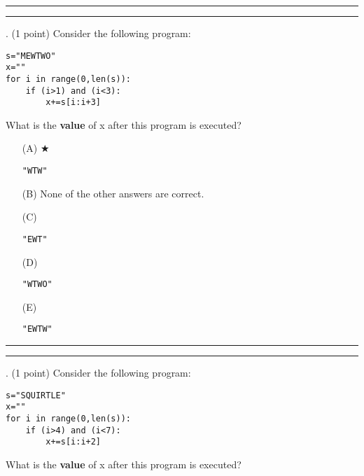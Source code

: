 \documentclass{article}
\begin{document}
\vspace*{2em}
\hrule
\vspace{2em}

\vspace{2em}
\hrule height 2pt


\newpage
{}. (1 point)
Consider the following program:
\begin{verbatim}
s="MEWTWO"
x=""
for i in range(0,len(s)):
    if (i>1) and (i<3):
        x+=s[i:i+3]

\end{verbatim}
What is the \textbf{value} of x after this program is executed?


\begin{enumerate}
\item[(A)] $\bigstar$ 
\begin{verbatim}"WTW"\end{verbatim}

\item[(B)]
None of the other answers are correct.

\item[(C)]
\begin{verbatim}"EWT"\end{verbatim}

\item[(D)]
\begin{verbatim}"WTWO"\end{verbatim}

\item[(E)]
\begin{verbatim}"EWTW"\end{verbatim}

\end{enumerate}

\vspace*{2em}
\hrule
\vspace{2em}

\vspace{2em}
\hrule height 2pt


\newpage
{}. (1 point)
Consider the following program:
\begin{verbatim}
s="SQUIRTLE"
x=""
for i in range(0,len(s)):
    if (i>4) and (i<7):
        x+=s[i:i+2]
\end{verbatim}
What is the \textbf{value} of x after this program is executed?
\end{document}
